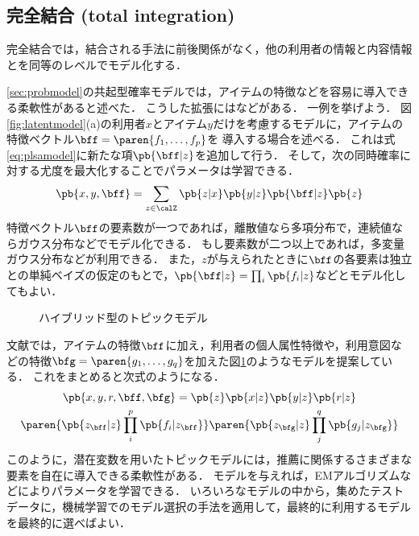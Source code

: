 

\subsection{完全結合 (total integration)}

完全結合では，結合される手法に前後関係がなく，他の利用者の情報と内容情報とを同等のレベルでモデル化する．

\ref{sec:probmodel}の共起型確率モデルでは，アイテムの特徴などを容易に導入できる柔軟性があると述べた．
こうした拡張には\cite{uai:01:01,ijcai:05:01,trieice:06:04,tripsj:06:02,tieice:07:02}などがある．
一例を挙げよう．
図\ref{fig:latentmodel}(a)の利用者$x$とアイテム$y$だけを考慮するモデルに，アイテムの特徴ベクトル$\bff=\paren{f_1,\ldots,f_p}$を
導入する場合を述べる．
これは式\eqref{eq:plsamodel}に新たな項$\pb{\bff|z}$を追加して行う．
そして，次の同時確率に対する尤度を最大化することでパラメータは学習できる．
\[
 \pb{x,y,\bff} = \sum_{z\in\calZ} \pb{z|x} \pb{y|z}\pb{\bff|z}\pb{z}
\]
特徴ベクトル$\bff$の要素数が一つであれば，離散値なら多項分布で，連続値ならガウス分布などでモデル化できる．
もし要素数が二つ以上であれば，多変量ガウス分布などが利用できる．
また，$z$が与えられたときに$\bff$の各要素は独立との単純ベイズの仮定のもとで，$\pb{\bff|z}=\prod_i\pb{f_i|z}$などとモデル化してもよい．

\begin{figure}
\centering
{}
\caption{ハイブリッド型のトピックモデル\cite{trieice:06:04}}
\label{fig:combined-topicmodel}
\end{figure}

文献\cite{trieice:06:04}では，アイテムの特徴$\bff$に加え，利用者の個人属性特徴や，利用意図などの特徴$\bfg=\paren{g_1,\ldots,g_q}$を加えた図\ref{fig:combined-topicmodel}のようなモデルを提案している．
これをまとめると次式のようになる．
\begin{multline*}
\pb{x,y,r,\bff,\bfg} =
 \pb{z}\pb{x|z}\pb{y|z}\pb{r|z}\\
\paren{\pb{z_\bff|z}\prod_i^p\pb{f_i|z_\bff}}
\paren{\pb{z_\bfg|z}\prod_j^q\pb{g_j|z_\bfg}}
\end{multline*}
%
このように，潜在変数を用いたトピックモデルには，推薦に関係するさまざまな要素を自在に導入できる柔軟性がある．
モデルを与えれば，EMアルゴリズムなどによりパラメータを学習できる．
いろいろなモデルの中から，集めたテストデータに，機械学習でのモデル選択の手法を適用して，最終的に利用するモデルを最終的に選べばよい．

